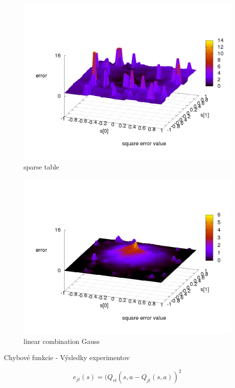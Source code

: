 \begin{figure}[!htb]
\centering
\includegraphics[scale=.4]{../../results_q_learning/map_1/function_type_1/q_learning_error.png}
\caption{sparse table}
\end{figure}


\begin{figure}[!htb]
\centering
\includegraphics[scale=.4]{../../results_q_learning/map_1/function_type_2/q_learning_error.png}
\caption{linear combination Gauss}
\end{figure}



Chybové funkcie - Výsledky experimentov

\begin{equation}
e_{jt}(s) = (Q_{rt}(s,a - Q_{jt}(s,a))^2  \nonumber
\end{equation}

